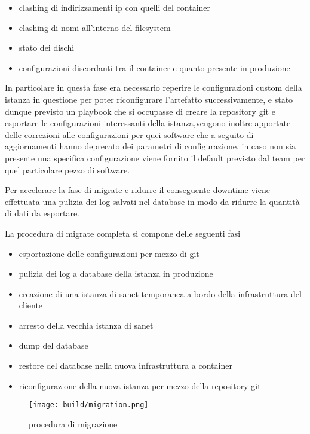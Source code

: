 \begin{itemize}
  \item{clashing di indirizzamenti ip con quelli del container}
  \item{clashing di nomi all'interno del filesystem}
  \item{stato dei dischi}
  \item{configurazioni discordanti tra il container e quanto presente in produzione}
\end{itemize}

In particolare in questa fase era necessario reperire le configurazioni custom della istanza in questione per poter riconfigurare l'artefatto successivamente, e stato dunque previsto un playbook che si occupasse di creare la repository git e esportare le configurazioni interessanti della istanza,vengono inoltre apportate delle correzioni alle configurazioni per quei software che a seguito di aggiornamenti hanno deprecato dei parametri di configurazione, in caso non sia presente una specifica configurazione viene fornito il default previsto dal team per quel particolare pezzo di software.

Per accelerare la fase di migrate e ridurre il conseguente downtime viene effettuata una pulizia  dei log salvati nel database in modo da ridurre la quantità di dati da esportare.

La procedura di migrate completa si compone delle seguenti fasi

\begin{itemize}
  \item{esportazione delle configurazioni per mezzo di git}
  \item{pulizia dei log a database della istanza in produzione}
  \item{creazione di una istanza di sanet temporanea a bordo della infrastruttura del cliente}
  \item{arresto della vecchia istanza di sanet}
  \item{dump del database}
  \item{restore del database nella nuova infrastruttura a container}
  \item{riconfigurazione della nuova istanza per mezzo della repository git}
\end{itemize}

\begin{figure}[H]
    \centering
    \texttt{[image: build/migration.png]}
    \caption{procedura di migrazione}
    \label{fig:enter-label}
\end{figure}


